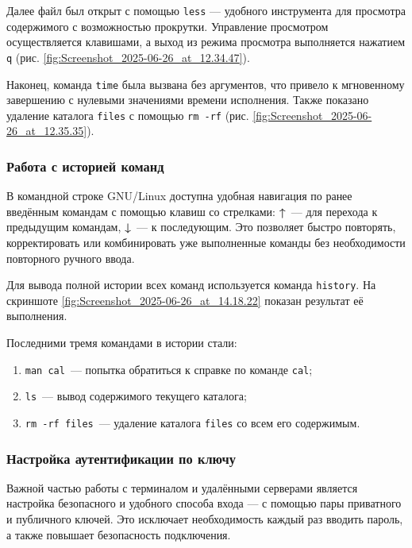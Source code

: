 Далее файл был открыт с помощью \texttt{less} — удобного инструмента для просмотра содержимого с возможностью прокрутки. Управление просмотром осуществляется клавишами, а выход из режима просмотра выполняется нажатием \texttt{q} (рис. \ref{fig:Screenshot_2025-06-26_at_12.34.47}).

Наконец, команда \texttt{time} была вызвана без аргументов, что привело к мгновенному завершению с нулевыми значениями времени исполнения. Также показано удаление каталога \texttt{files} с помощью \texttt{rm -rf} (рис. \ref{fig:Screenshot_2025-06-26_at_12.35.35}).

\subsubsection{Работа с историей команд}

В командной строке GNU/Linux доступна удобная навигация по ранее введённым командам с помощью клавиш со стрелками: \textbf{↑}~— для перехода к предыдущим командам, \textbf{↓}~— к последующим. Это позволяет быстро повторять, корректировать или комбинировать уже выполненные команды без необходимости повторного ручного ввода.

Для вывода полной истории всех команд используется команда \texttt{history}. На скриншоте \ref{fig:Screenshot_2025-06-26_at_14.18.22} показан результат её выполнения.

Последними тремя командами в истории стали:
\begin{enumerate}
    \item \texttt{man cal}~— попытка обратиться к справке по команде \texttt{cal};
    \item \texttt{ls}~— вывод содержимого текущего каталога;
    \item \texttt{rm -rf files}~— удаление каталога \texttt{files} со всем его содержимым.
\end{enumerate}


\subsubsection*{Настройка аутентификации по ключу}

Важной частью работы с терминалом и удалёнными серверами является настройка безопасного и удобного способа входа — с помощью пары приватного и публичного ключей. Это исключает необходимость каждый раз вводить пароль, а также повышает безопасность подключения.

